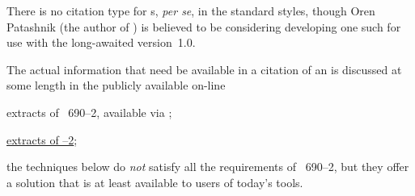 
There is no citation type for s, \emph{per se}, in the
standard \BibTeX{} styles, though Oren Patashnik (the author of
\BibTeX{}) is believed to be considering developing one such for use
with the long-awaited \BibTeX{} version~1.0.

The actual information that need be available in a citation of an
 is discussed at some length in the publicly available
on-line 
\begin{narrowversion}
  extracts of ~690--2, available via
  ;
\end{narrowversion}
\begin{wideversion}
\href{http://www.nlc-bnc.ca/iso/tc46sc9/standard/690-2e.htm}{extracts of --2};
\end{wideversion}
the techniques below do \emph{not} satisfy all the requirements of
~690--2, but they offer a solution that is at least
available to users of today's tools.

